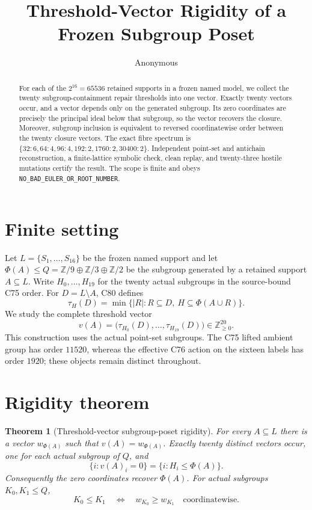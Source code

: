 \documentclass[10pt]{article}
\title{Threshold-Vector Rigidity of a Frozen Subgroup Poset}
\author{Anonymous}
\date{}
\newtheorem{theorem}{Theorem}
\newcommand{\Phiop}{\Phi}
\newcommand{\Q}{Q}
\begin{document}
\maketitle

\begin{abstract}
For each of the $2^{16}=65536$ retained supports in a frozen named model, we
collect the twenty subgroup-containment repair thresholds into one vector.
Exactly twenty vectors occur, and a vector depends only on the generated
subgroup.  Its zero coordinates are precisely the principal ideal below that
subgroup, so the vector recovers the closure.  Moreover, subgroup inclusion
is equivalent to reversed coordinatewise order between the twenty closure
vectors.  The exact fibre spectrum is
$\{32{:}6,64{:}4,96{:}4,192{:}2,1760{:}2,30400{:}2\}$.
Independent point-set and antichain reconstruction, a finite-lattice symbolic
check, clean replay, and twenty-three hostile mutations certify the result.
The scope is finite and obeys
\texttt{NO\_BAD\_EULER\_OR\_ROOT\_NUMBER}.
\end{abstract}

\section{Finite setting}
Let $L=\{S_1,\ldots,S_{16}\}$ be the frozen named support and let
$\Phiop(A)\leq\Q=\mathbb Z/9\oplus\mathbb Z/3\oplus\mathbb Z/2$ be the
subgroup generated by a retained support $A\subseteq L$.  Write
$H_0,\ldots,H_{19}$ for the twenty actual subgroups in the source-bound C75
order.  For $D=L\setminus A$, C80 defines
\[
 \tau_H(D)=\min\{|R|:R\subseteq D,\ H\subseteq\Phiop(A\cup R)\}.
\]
We study the complete threshold vector
\[
 v(A)=\bigl(\tau_{H_0}(D),\ldots,\tau_{H_{19}}(D)\bigr)
 \in\mathbb Z_{\geq0}^{20}.
\]
This construction uses the actual point-set subgroups.  The C75 lifted
ambient group has order $11520$, whereas the effective C76 action on the
sixteen labels has order $1920$; these objects remain distinct throughout.

\section{Rigidity theorem}
\begin{theorem}[Threshold-vector subgroup-poset rigidity]
For every $A\subseteq L$ there is a vector $w_{\Phiop(A)}$ such that
$v(A)=w_{\Phiop(A)}$.  Exactly twenty distinct vectors occur, one for each
actual subgroup of $\Q$, and
\[
 \{i:v(A)_i=0\}=\{i:H_i\leq\Phiop(A)\}.
\]
Consequently the zero coordinates recover $\Phiop(A)$.  For actual subgroups
$K_0,K_1\leq\Q$,
\[
 K_0\leq K_1
 \quad\Longleftrightarrow\quad
 w_{K_0}\geq w_{K_1}\quad\text{coordinatewise}.
\]
\end{theorem}
\end{document}
